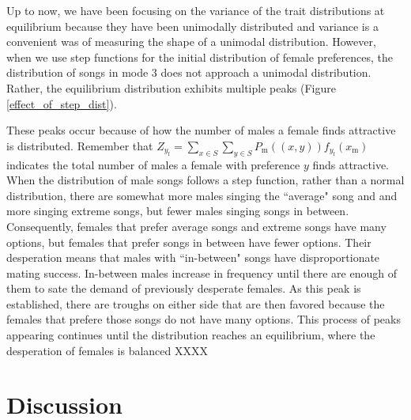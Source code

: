 \documentclass{article}
\newcommand{\x}[1]{\text{#1}}
\begin{document}
Up to now, we have been focusing on the variance of the trait distributions at equilibrium because they have been unimodally distributed and variance is a convenient was of measuring the shape of a unimodal distribution. However, when we use step functions for the initial distribution of female preferences, the distribution of songs in mode $3$ does not approach a unimodal distribution. Rather, the equilibrium distribution exhibits multiple peaks (Figure \ref{effect_of_step_dist}). 

These peaks occur because of how the number of males a female finds attractive is distributed. Remember that $Z_{y_\x{f}}=\sum_{x\in S}\sum_{y\in S}P_\x{m}((x,y))f_{y_\x{f}}(x_\x{m})$ indicates the total number of males a female with preference $y$ finds attractive. When the distribution of male songs follows a step function, rather than a normal distribution, there are somewhat more males singing the ``average" song and and more singing extreme songs, but fewer males singing songs in between. Consequently, females that prefer average songs and extreme songs have many options, but females that prefer songs in between have fewer options. Their desperation means that males with ``in-between" songs have disproportionate mating success. In-between males increase in frequency until there are enough of them to sate the demand of previously desperate females. As this peak is established, there are troughs on either side that are then favored because the females that prefere those songs do not have many options. This process of peaks appearing continues until the distribution reaches an equilibrium, where the desperation of females is balanced XXXX

\section*{Discussion}

\end{document}
